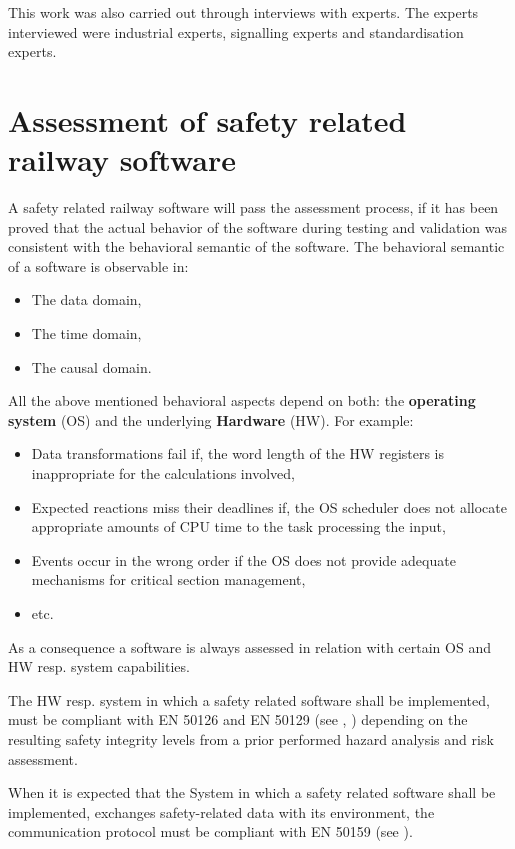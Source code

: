 \documentclass{template/openetcs_report}
\begin{document}
This work was also carried out through interviews with experts. The experts interviewed were industrial experts, signalling experts and standardisation experts. 


\section{Assessment of safety related railway software}
A safety related railway software will pass the assessment process, if it has been proved that the actual behavior of the software during testing and validation was consistent with the behavioral semantic of the software. 
The behavioral semantic of a software is observable in: 
\begin{itemize}\itemsep=0pt
  \item The data domain,
  \item The time domain,
  \item The causal domain.
\end{itemize}

All the above mentioned behavioral aspects depend on both: the \textbf{operating system} (OS) and the underlying \textbf{Hardware} (HW). 
For example:
\begin{itemize}\itemsep=0pt
  \item Data transformations fail if, the word length of the HW registers is inappropriate for the calculations involved,
  \item Expected reactions miss their deadlines if, the OS scheduler does not allocate appropriate amounts of CPU time to the task processing the input,
  \item Events occur in the wrong order if the OS does not provide adequate mechanisms for critical section management,
  \item etc.
\end{itemize}

As a consequence a software is always assessed in relation with certain OS and HW resp. system capabilities.

The HW resp. system in which a safety related software shall be implemented, must be compliant with EN 50126 and EN 50129 (see \cite{EN50126}, \cite{EN50129}) depending on the resulting safety integrity levels from a prior performed hazard analysis and risk assessment.

When it is expected that the System in which a safety related software shall be implemented, exchanges safety-related data with its environment, the communication protocol must be compliant with EN 50159 (see \cite{EN50159}).
\end{document}
